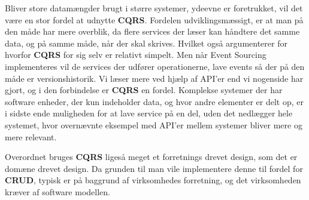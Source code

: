 Bliver store datamængder brugt i større systemer, ydeevne er foretrukket, vil det være en stor fordel at udnytte \textbf{CQRS}. Fordelen udviklingsmæssigt, er at man på den måde har mere overblik, da flere services der læser kan håndtere det samme data, og på samme måde, når der skal skrives. Hvilket også argumenterer for hvorfor \textbf{CQRS} for sig selv er relativt simpelt. Men når Event Sourcing implementeres vil de services der udfører operationerne, lave events så der på den måde er versionshistorik.
Vi læser mere ved hjælp af API'er end vi nogenside har gjort, og i den forbindelse er \textbf{CQRS} en fordel. Komplekse systemer der har software enheder, der kun indeholder data, og hvor andre elementer er delt op, er i sidste ende muligheden for at lave service på en del, uden det nedlægger hele systemet, hvor overnævnte eksempel med API'er mellem systemer bliver mere og mere relevant. 

Overordnet bruges \textbf{CQRS} ligeså meget et forretnings drevet design, som det er domæne drevet design. Da grunden til man vile implementere denne til fordel for \textbf{CRUD}, typisk er på baggrund af virksomhedes forretning, og det virksomheden kræver af software modellen.